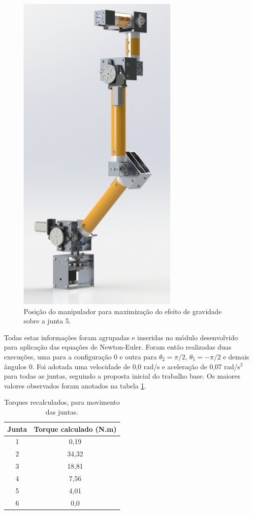 \begin{figure}[ht!]
    \caption{Posição do manipulador para maximização do efeito de gravidade sobre a junta 5.}    
    \begin{centering}

        \includegraphics[width=0.2\columnwidth]{images/arm/p90.jpg}
    
    \par\end{centering}

    \label{fig:configuracao2}
\end{figure}

Todas estas informações foram agrupadas e inseridas no módulo desenvolvido para aplicação 
das equações de Newton-Euler. Foram então realizadas duas execuções, uma para a configuração 0
e outra para $\theta_2 = \pi/2$, $\theta_5 = -\pi/2$ e demais ângulos 0. Foi adotada uma 
velocidade de 0,0 rad/s e aceleração de 0,07 rad/s$^2$ para todas as juntas, seguindo a proposta
inicial do trabalho base. Os maiores valores observados foram anotados na tabela 
\ref{tab:Torques-Novo}. 

\begin{table}[htb]
    \begin{centering}    
    
    \caption{Torques recalculados, para movimento das juntas.}
    
    \begin{tabular}{|c|c|}
        \hline
        Junta & Torque calculado (N.m) \tabularnewline
        \hline
        \hline
        1 & 0,19 \tabularnewline
        \hline
        2 & 34,32 \tabularnewline
        \hline
        3 & 18,81 \tabularnewline
        \hline
        4 & 7,56 \tabularnewline
        \hline
        5 & 4,01 \tabularnewline
        \hline
        6 & 0,0  \tabularnewline
        \hline
    \end{tabular}
    
    \label{tab:Torques-Novo}
    
\par\end{centering}
\end{table}

